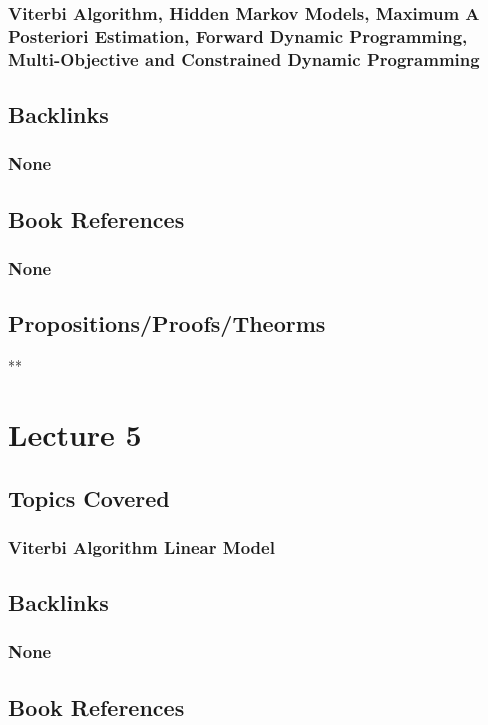 \documentclass[11pt]{article}
\begin{document}
\subsubsection*{Viterbi Algorithm, Hidden Markov Models, Maximum A Posteriori Estimation, Forward Dynamic Programming, Multi-Objective and Constrained Dynamic Programming}
\label{sec:orgff1d38b}
\subsection*{Backlinks}
\label{sec:orga26aefd}
\subsubsection*{None}
\label{sec:org55638c6}
\subsection*{Book References}
\label{sec:org50918fb}
\subsubsection*{None}
\label{sec:org0442988}
\subsection*{Propositions/Proofs/Theorms}
\label{sec:org5560091}
**

\section*{Lecture 5}
\label{sec:orgc83cab3}
\subsection*{Topics Covered}
\label{sec:orgfb452f9}
\subsubsection*{Viterbi Algorithm Linear Model}
\label{sec:org5d62535}
\subsection*{Backlinks}
\label{sec:orga5d0e2b}
\subsubsection*{None}
\label{sec:org78d6c3d}
\subsection*{Book References}
\label{sec:orgd606f05}
\end{document}
